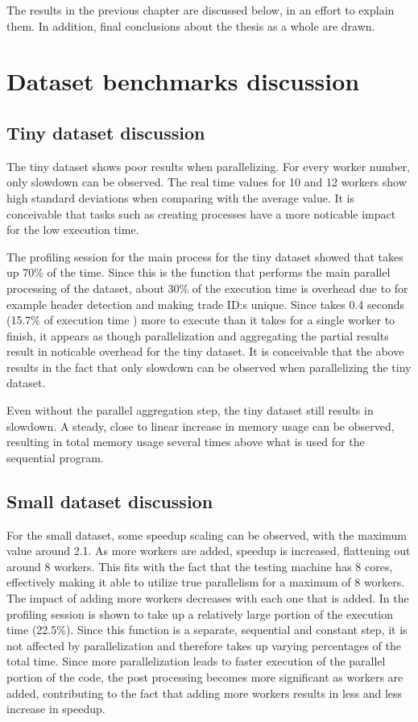 The results in the previous chapter are discussed below, in an effort to explain them. In addition, final conclusions
about the thesis as a whole are drawn.

\section{Dataset benchmarks discussion}
\subsection{Tiny dataset discussion}
The tiny dataset shows poor results when parallelizing. For every worker number, only slowdown can be observed.
The real time values for 10 and 12 workers show high standard deviations when comparing with the average value. It is conceivable that
tasks such as creating processes have a more noticable impact for the low execution time.

The profiling session for the main process for the tiny dataset showed that  takes up 70\% of the time. Since this is the function
that performs the main parallel processing of the dataset, about 30\% of the execution time is overhead due to for example header detection
and making trade ID:s unique. Since  takes 0.4 seconds (15.7\% of execution time ) more to execute than it takes for a single worker to finish,
it appears as though parallelization and aggregating the partial results result in noticable overhead for the tiny dataset.
It is conceivable that the above results in the fact that only slowdown can be observed when parallelizing the tiny dataset.

Even without the parallel aggregation step, the tiny dataset still results in slowdown. A steady, close to linear increase in memory usage can be observed,
resulting in total memory usage several times above what is used for the sequential program.

\subsection{Small dataset discussion}
For the small dataset, some speedup scaling can be observed, with the maximum value around 2.1. As more workers are added, speedup is increased,
flattening out around 8 workers. This fits with the fact that the testing machine has 8 cores, effectively making it able to utilize 
true parallelism for a maximum of 8 workers. The impact of adding more workers decreases with each one that is added. In the profiling session
 is shown to take up a relatively large portion of the execution time (22.5\%). Since this function is a separate,
sequential and constant step, it is not affected by parallelization and therefore takes up varying percentages of the total time. Since more parallelization
leads to faster execution of the parallel portion of the code, the post processing becomes more significant as workers are added, contributing to the fact
that adding more workers results in less and less increase in speedup.

